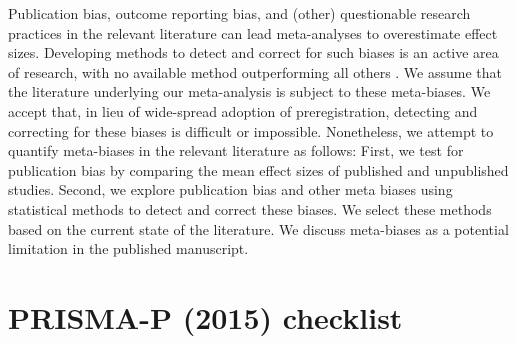 \documentclass[10pt, a4paper]{article}
\begin{document}
Publication bias, outcome reporting bias, and (other) questionable research practices in the relevant literature can lead meta-analyses to overestimate effect sizes. Developing methods to detect and correct for such biases is an active area of research, with no available method outperforming all others \cite{carter_correcting_2017}. We assume that the literature underlying our meta-analysis is subject to these meta-biases. We accept that, in lieu of wide-spread adoption of preregistration, detecting and correcting for these biases is difficult or impossible. Nonetheless, we attempt to quantify meta-biases in the relevant literature as follows: First, we test for publication bias by comparing the mean effect sizes of published and unpublished studies. Second, we explore publication bias and other meta biases using statistical methods to detect and correct these biases. We select these methods based on the current state of the literature. We discuss meta-biases as a potential limitation in the published manuscript.

\section{PRISMA-P (2015) checklist}
\end{document}
